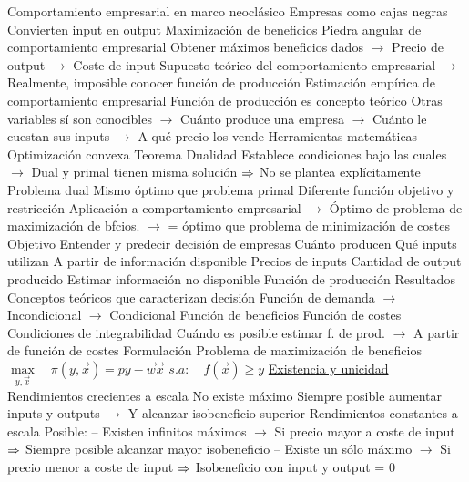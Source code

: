 \documentclass{nuevotema}
\begin{document}
\begin{esquemal}
				\4 Comportamiento empresarial en marco neoclásico
				\4[] Empresas como cajas negras
				\4[] Convierten input en output
				\4 Maximización de beneficios
				\4[] Piedra angular de comportamiento empresarial
				\4[] Obtener máximos beneficios dados
				\4[] $\to$ Precio de output
				\4[] $\to$ Coste de input
				\4[] Supuesto teórico del comportamiento empresarial
				\4[] $\to$ Realmente, imposible conocer función de producción
				\4 Estimación empírica de comportamiento empresarial
				\4[] Función de producción es concepto teórico
				\4[] Otras variables sí son conocibles
				\4[] $\to$ Cuánto produce una empresa
				\4[] $\to$ Cuánto le cuestan sus inputs
				\4[] $\to$ A qué precio los vende
				\4 Herramientas matemáticas
				\4[] Optimización convexa
				\4[] Teorema Dualidad
				\4[] Establece condiciones bajo las cuales
				\4[] $\to$ Dual y primal tienen misma solución
				\4[] $\Rightarrow$ No se plantea explícitamente
				\4 Problema dual
				\4[] Mismo óptimo que problema primal
				\4[] Diferente función objetivo y restricción
				\4[] Aplicación a comportamiento empresarial
				\4[] $\to$ Óptimo de problema de maximización de bfcios.
				\4[] $\to$ = óptimo que problema de minimización de costes
			\3 Objetivo
				\4 Entender y predecir decisión de empresas
				\4 Cuánto producen
				\4 Qué inputs utilizan
				\4 A partir de información disponible
				\4[] Precios de inputs
				\4[] Cantidad de output producido
				\4 Estimar información no disponible
				\4[] Función de producción
			\3 Resultados
				\4 Conceptos teóricos que caracterizan decisión
				\4[] Función de demanda
				\4[] $\to$ Incondicional
				\4[] $\to$ Condicional
				\4[] Función de beneficios
				\4[] Función de costes
				\4 Condiciones de integrabilidad
				\4[] Cuándo es posible estimar f. de prod.
				\4[] $\to$ A partir de función de costes
		\2 Formulación
			\3[Primal] Problema de maximización de beneficios
				\4[] $\underset{y, \vec{x}}{\max} \quad \pi(y, \vec{x}) = py - \vec{w} \vec{x} $
				\4[] $s.a: \quad f(\vec{x}) \geq y$
				\4 \underline{Existencia y unicidad}
				\4 Rendimientos crecientes a escala
				\4[] No existe máximo
				\4[] Siempre posible aumentar inputs y outputs
				\4[] $\to$ Y alcanzar isobeneficio superior
				\4[] 
				\4 Rendimientos constantes a escala
				\4[] Posible:
				\4[] -- Existen infinitos máximos
				\4[] $\to$ Si precio mayor a coste de input
				\4[] $\Rightarrow$ Siempre posible alcanzar mayor isobeneficio
				\4[] -- Existe un sólo máximo
				\4[] $\to$ Si precio menor a coste de input
				\4[] $\Rightarrow$ Isobeneficio con input y output = 0

\end{esquemal}
\end{document}

